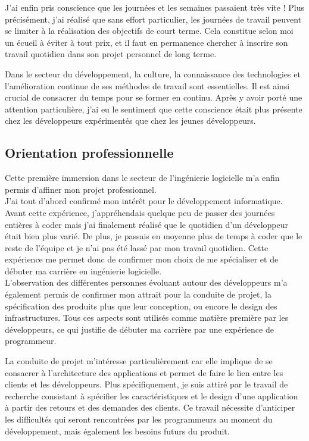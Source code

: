 \documentclass[11pt, oneside, titlepage, a4paper]{article}
\begin{document}
J'ai enfin pris conscience que les journées et les semaines passaient très vite ! Plus précisément, j'ai réalisé que sans effort particulier, les journées de travail peuvent se limiter à la réalisation des objectifs de court terme. Cela constitue selon moi un écueil à éviter à tout prix, et il faut en permanence chercher à inscrire son travail quotidien dans son projet personnel de long terme.

Dans le secteur du développement, la culture, la connaissance des technologies et l'amélioration continue de ses méthodes de travail sont essentielles. Il est ainsi crucial de consacrer du temps pour se former en continu. Après y avoir porté une attention particulière, j'ai eu le sentiment que cette \og conscience \fg{} était plus présente chez les développeurs expérimentés que chez les jeunes développeurs.
	\subsection{Orientation professionnelle}
Cette première immersion dans le secteur de l'ingénierie logicielle m'a enfin permis d'affiner mon projet professionnel.
\\

J'ai tout d'abord confirmé mon intérêt pour le développement informatique. Avant cette expérience, j'appréhendais quelque peu de passer des journées entières à coder mais j'ai finalement réalisé que le quotidien d'un développeur était bien plus varié. De plus, je passais en moyenne plus de temps à coder que le reste de l'équipe et je n'ai pas été \og lassé \fg{} par mon travail quotidien. Cette expérience me permet donc de confirmer mon choix de me spécialiser et de débuter ma carrière en ingénierie logicielle.
\\

L'observation des différentes personnes évoluant autour des développeurs m'a également permis de confirmer mon attrait pour la conduite de projet, la spécification des produits plus que leur conception, ou encore le design des infrastructures. Tous ces aspects sont utilisés comme \og matière première\fg{} par les développeurs, ce qui justifie de débuter ma carrière par une expérience de programmeur.

La conduite de projet m'intéresse particulièrement car elle implique de se consacrer à l'architecture des applications et permet de faire le lien entre les clients et les développeurs. Plus spécifiquement, je suis attiré par le travail de recherche consistant à spécifier les caractéristiques et le design d'une application à partir des retours et des demandes des clients. Ce travail nécessite d'anticiper les difficultés qui seront rencontrées par les programmeurs au moment du développement, mais également les besoins futurs du produit.
\newpage
\end{document}
